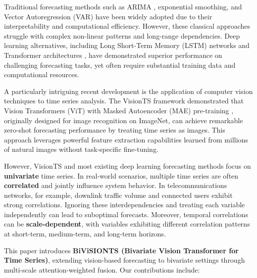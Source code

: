 \documentclass[preprint,12pt,authoryear]{elsarticle}
\begin{document}
Traditional forecasting methods such as ARIMA \citep{box1970}, exponential smoothing, and Vector Autoregression (VAR) \citep{sims1980} have been widely adopted due to their interpretability and computational efficiency. However, these classical approaches struggle with complex non-linear patterns and long-range dependencies. Deep learning alternatives, including Long Short-Term Memory (LSTM) networks \citep{hochreiter1997} and Transformer architectures \citep{vaswani2017}, have demonstrated superior performance on challenging forecasting tasks, yet often require substantial training data and computational resources.

A particularly intriguing recent development is the application of computer vision techniques to time series analysis. The VisionTS framework \citep{visionts2024} demonstrated that Vision Transformers (ViT) with Masked Autoencoder (MAE) pre-training \citep{he2022mae}, originally designed for image recognition on ImageNet, can achieve remarkable zero-shot forecasting performance by treating time series as images. This approach leverages powerful feature extraction capabilities learned from millions of natural images without task-specific fine-tuning.

However, VisionTS and most existing deep learning forecasting methods focus on \textbf{univariate} time series. In real-world scenarios, multiple time series are often \textbf{correlated} and jointly influence system behavior. In telecommunications networks, for example, downlink traffic volume and connected users exhibit strong correlations. Ignoring these interdependencies and treating each variable independently can lead to suboptimal forecasts. Moreover, temporal correlations can be \textbf{scale-dependent}, with variables exhibiting different correlation patterns at short-term, medium-term, and long-term horizons.

This paper introduces \textbf{BiViSIONTS (Bivariate Vision Transformer for Time Series)}, extending vision-based forecasting to bivariate settings through multi-scale attention-weighted fusion. Our contributions include:
\end{document}
